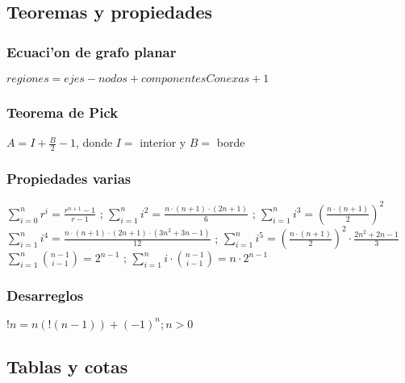 \documentclass[10pt, landscape, twocolumn, a4paper, notitlepage]{article}
\begin{document}
\subsection{Teoremas y propiedades}%
\subsubsection{Ecuaci'on de grafo planar}
$regiones = ejes - nodos + componentesConexas + 1$
\subsubsection{Teorema de Pick}
$A = I + \frac{B}{2} - 1$, donde $I =$ interior y $B =$ borde
%
\subsubsection{Propiedades varias}
$\sum_{i=0}^n{r^i} = \frac{r^{n+1}-1}{r-1}$ ; $\sum_{i=1}^n{i^2} = \frac{n\cdot(n+1)\cdot(2n+1)}{6}$ ;
$\sum_{i=1}^n{i^3} = \left(\frac{n\cdot(n+1)}{2}\right)^2$ \\
$\sum_{i=1}^n{i^4} = \frac{n\cdot(n+1)\cdot(2n+1)\cdot(3n^2+3n-1)}{12}$ ;
$\sum_{i=1}^{ n} i^5 = \left(\frac{ n \cdot (n+1)}{2}\right) ^2 \cdot \frac{2 n ^2 + 2n - 1}{3}$ \\
%
$\sum_{i=1}^n{\binom{n-1}{i-1}} = 2^{n-1}$ ; $\sum_{i=1}^n{i\cdot\binom{n-1}{i-1}} = n\cdot2^{n-1}$ \\
\subsubsection{Desarreglos}
$!n = n(!(n - 1)) + (-1)^n; n > 0$ 
\subsection{Tablas y cotas}
\end{document}
